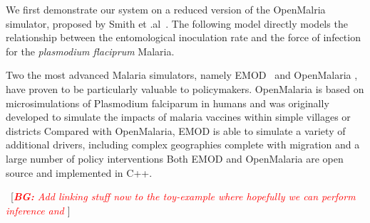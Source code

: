 \documentclass{article}
\newcommand{\bg}[1]{~{{[{\it \textcolor{red}{{\bf BG:} #1}}]}}}
\begin{document}
We first demonstrate our system on a reduced version of the OpenMalria simulator, proposed by Smith et .al~\cite{smith2006relationship}. The following model directly models the relationship between the entomological inoculation rate and the force of infection for the \emph{plasmodium flaciprum} Malaria. 

Two the most advanced Malaria simulators, namely EMOD~\cite{bershteyn2018implementation} and OpenMalaria  \cite{smith2008towards}, have proven to be particularly valuable to policymakers.
OpenMalaria is based on microsimulations of Plasmodium falciparum in humans and was originally developed to simulate the impacts of malaria vaccines within simple villages or districts
Compared with OpenMalaria, EMOD is able to simulate a variety of additional drivers, including complex geographies complete with migration and a large number of policy interventions
Both EMOD and OpenMalaria are open source and implemented in C++.

\bg{Add linking stuff now to the toy-example where hopefully we can perform inference and }






%


\end{document}
